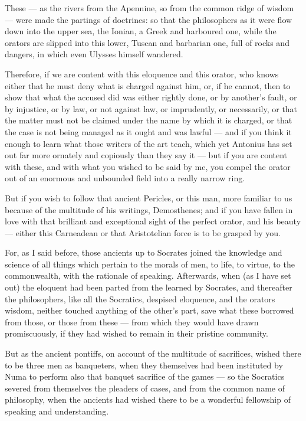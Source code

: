  These — as the rivers from the Apennine, so from the common ridge of wisdom — were made the partings of doctrines: so that the philosophers as it were flow down into the upper sea, the Ionian, a Greek and harboured one, while the orators are slipped into this lower, Tuscan and barbarian one, full of rocks and dangers, in which even Ulysses himself wandered.

 Therefore, if we are content with this eloquence and this orator, who knows either that he must deny what is charged against him, or, if he cannot, then to show that what the accused did was either rightly done, or by another's fault, or by injustice, or by law, or not against law, or imprudently, or necessarily, or that the matter must not be claimed under the name by which it is charged, or that the case is not being managed as it ought and was lawful — and if you think it enough to learn what those writers of the art teach, which yet Antonius has set out far more ornately and copiously than they say it — but if you are content with these, and with what you wished to be said by me, you compel the orator out of an enormous and unbounded field into a really narrow ring.

 But if you wish to follow that ancient Pericles, or this man, more familiar to us because of the multitude of his writings, Demosthenes; and if you have fallen in love with that brilliant and exceptional sight of the perfect orator, and his beauty — either this Carneadean or that Aristotelian force is to be grasped by you.

 For, as I said before, those ancients up to Socrates joined the knowledge and science of all things which pertain to the morals of men, to life, to virtue, to the commonwealth, with the rationale of speaking. Afterwards, when (as I have set out) the eloquent had been parted from the learned by Socrates, and thereafter the philosophers, like all the Socratics, despised eloquence, and the orators wisdom, neither touched anything of the other's part, save what these borrowed from those, or those from these — from which they would have drawn promiscuously, if they had wished to remain in their pristine community.

 But as the ancient pontiffs, on account of the multitude of sacrifices, wished there to be three men as banqueters, when they themselves had been instituted by Numa to perform also that banquet sacrifice of the games — so the Socratics severed from themselves the pleaders of cases, and from the common name of philosophy, when the ancients had wished there to be a wonderful fellowship of speaking and understanding.

